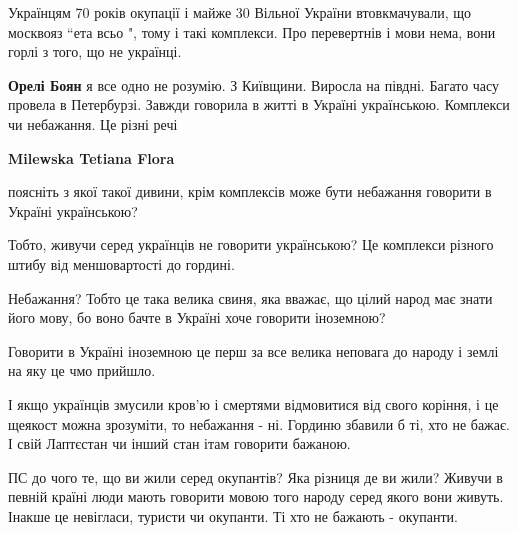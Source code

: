 \begin{itemize}
 

Українцям 70 років окупації і майже 30 Вільної України втовкмачували, що
москвояз “ета всьо ", тому і такі комплекси. Про перевертнів і мови нема, вони
горлі з того, що не українці.

\begin{itemize}
 
\textbf{Орелі Боян} я все одно не розумію. З Київщини. Виросла на півдні. Багато часу провела в Петербурзі. Завжди говорила в житті в Україні українською. Комплекси чи небажання. Це різні речі

 
\textbf{Milewska Tetiana Flora} 

поясніть з якої такої дивини, крім комплексів може бути небажання говорити в
Україні українською?

Тобто, живучи серед українців не говорити українською? Це комплекси різного
штибу від меншовартості до гордині.

Небажання? Тобто це така велика свиня, яка вважає, що цілий народ має знати
його мову, бо воно бачте в Україні хоче говорити іноземною?

Говорити в Україні іноземною це перш за все велика неповага до народу і землі
на яку це чмо прийшло.

І якщо українців змусили кров'ю і смертями відмовитися від свого коріння, і це
щеякост можна зрозуміти, то небажання - ні. Гординю збавили б ті, хто не бажає.
І свій Лаптєстан чи інший стан ітам говорити бажаною.

ПС до чого те, що ви жили серед окупантів? Яка різниця де ви жили? Живучи в
певній країні люди мають говорити мовою того народу серед якого вони живуть.
Інакше це невігласи, туристи чи окупанти. Ті хто не бажають - окупанти.


\end{itemize}
\end{itemize}
